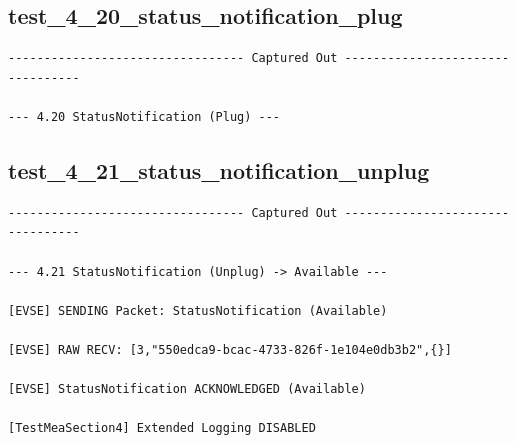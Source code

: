 \documentclass{article}
\begin{document}
\subsection*{test\_4\_20\_status\_notification\_plug}
\begin{lstlisting}
--------------------------------- Captured Out ---------------------------------

--- 4.20 StatusNotification (Plug) ---
\end{lstlisting}
\subsection*{test\_4\_21\_status\_notification\_unplug}
\begin{lstlisting}
--------------------------------- Captured Out ---------------------------------

--- 4.21 StatusNotification (Unplug) -> Available ---

[EVSE] SENDING Packet: StatusNotification (Available)

[EVSE] RAW RECV: [3,"550edca9-bcac-4733-826f-1e104e0db3b2",{}]

[EVSE] StatusNotification ACKNOWLEDGED (Available)

[TestMeaSection4] Extended Logging DISABLED
\end{lstlisting}
\end{document}
